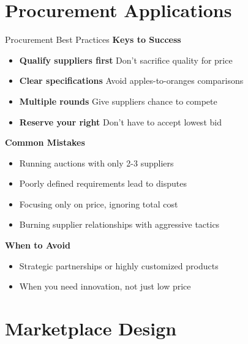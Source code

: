 \documentclass[xcolor={x11names}]{beamer}
\begin{document}
\section{Procurement Applications}


\begin{frame}{Procurement Best Practices}
\textbf{Keys to Success}
\begin{itemize}
  \item \textbf{Qualify suppliers first} Don't sacrifice quality for price
  \item \textbf{Clear specifications} Avoid apples-to-oranges comparisons
  \item \textbf{Multiple rounds} Give suppliers chance to compete
  \item \textbf{Reserve your right} Don't have to accept lowest bid
\end{itemize}


\textbf{Common Mistakes}
\begin{itemize}
  \item Running auctions with only 2-3 suppliers
  \item Poorly defined requirements lead to disputes
  \item Focusing only on price, ignoring total cost
  \item Burning supplier relationships with aggressive tactics
\end{itemize}


\textbf{When to Avoid}
\begin{itemize}
  \item Strategic partnerships or highly customized products
  \item When you need innovation, not just low price
\end{itemize}
\end{frame}

\section{Marketplace Design}
\end{document}
